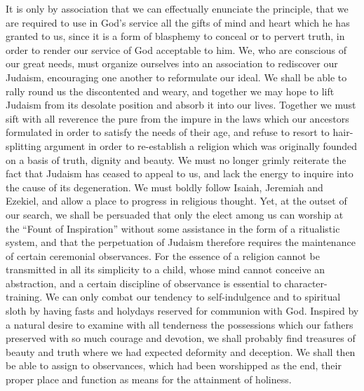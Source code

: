 It is only by association that we can effectually enunciate 
the principle, that we are required to use in God's service all 
the gifts of mind and heart which he has granted to us, since it 
is a form of blasphemy to conceal or to pervert truth, in order 
to render our service of God acceptable to him. We, who 
are conscious of our great needs, must organize ourselves into 
an association to rediscover our Judaism, encouraging one 
another to reformulate our ideal. We shall be able to rally 
round us the discontented and weary, and together we may 
hope to lift Judaism from its desolate position and absorb 
it into our lives. Together we must sift with all reverence 
the pure from the impure in the laws which our ancestors 
formulated in order to satisfy the needs of their age, and 
refuse to resort to hair-splitting argument in order to re-establish
a religion which was originally founded on a basis 
of truth, dignity and beauty. We must no longer grimly 
reiterate the fact that Judaism has ceased to appeal to us, 
and lack the energy to inquire into the cause of its degeneration. We must boldly follow Isaiah, Jeremiah and 
Ezekiel, and allow a place to progress in religious thought. 
Yet, at the outset of our search, we shall be persuaded that 
only the elect among us can worship at the ``Fount of 
Inspiration'' without some assistance in the form of a ritualistic system, and that the perpetuation of Judaism therefore 
requires the maintenance of certain ceremonial observances. 
For the essence of a religion cannot be transmitted in all 
its simplicity to a child, whose mind cannot conceive an 
abstraction, and a certain discipline of observance is 
essential to character-training. We can only combat 
our tendency to self-indulgence and to spiritual sloth by 
having fasts and holydays reserved for communion with 
God. Inspired by a natural desire to examine with all 
tenderness the possessions which our fathers preserved 
with so much courage and devotion, we shall probably find 
treasures of beauty and truth where we had expected deformity and deception. We shall then be able to assign to 
observances, which had been worshipped as the end, their 
proper place and function as means for the attainment of 
holiness. 


